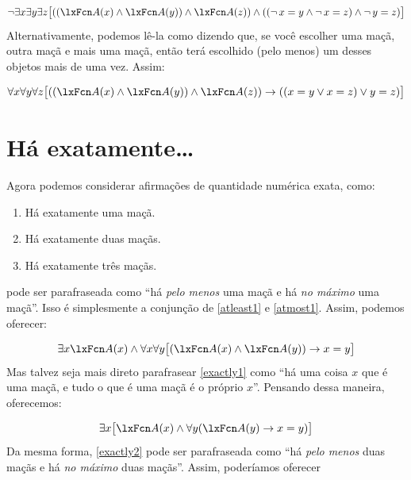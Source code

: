 \[
	\enot \exists x \exists y\exists z\bigl[((\atom{A}{x} \eand \atom{A}{y}) \eand \atom{A}{z}) \eand ((\enot\, {x = y} \eand \enot\, {x = z}) \eand \enot\, {y = z})\bigr]
\]
Alternativamente, podemos lê-la como dizendo que, se você escolher uma maçã, outra maçã e mais uma maçã, então terá escolhido (pelo menos) um desses objetos mais de uma vez. Assim:


\[
	\forall x\forall y\forall z\bigl[((\atom{A}{x} \eand \atom{A}{y}) \eand \atom{A}{z}) \eif ((x=y \eor x=z) \eor y=z)\bigr]
\]


\section{Há exatamente\ldots}\label{sec:exactlyn}

Agora podemos considerar afirmações de quantidade numérica exata, como:
\begin{enumerate}
\item\label{exactly1} Há exatamente uma maçã.
\item\label{exactly2} Há exatamente duas maçãs.
\item\label{exactly3} Há exatamente três maçãs.
\end{enumerate}
 pode ser parafraseada como \textquotedblleft há \emph{pelo menos} uma maçã e há \emph{no máximo} uma maçã\textquotedblright{}. Isso é simplesmente a conjunção de \cref{atleast1} e \cref{atmost1}. Assim, podemos oferecer:


\[
	\exists x \atom{A}{x} \eand \forall x\forall y\bigl[(\atom{A}{x} \eand \atom{A}{y}) \eif x=y\bigr]
\]
Mas talvez seja mais direto parafrasear \cref*{exactly1} como \textquotedblleft há uma coisa $x$ que é uma maçã, e tudo o que é uma maçã é o próprio $x$\textquotedblright{}. Pensando dessa maneira, oferecemos:


\[
	\exists x\bigl[\atom{A}{x} \eand \forall y(\atom{A}{y} \eif x= y)\bigr]
\]
Da mesma forma, \cref*{exactly2} pode ser parafraseada como \textquotedblleft há \emph{pelo menos} duas maçãs e há \emph{no máximo} duas maçãs\textquotedblright{}. Assim, poderíamos oferecer


